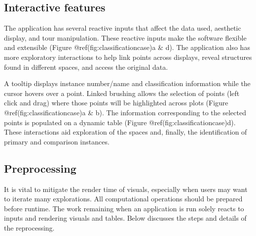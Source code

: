 \documentclass[
]{article}
\begin{document}
\hypertarget{interactive-features}{%
\subsection{Interactive features}\label{interactive-features}}

The application has several reactive inputs that affect the data used,
aesthetic display, and tour manipulation. These reactive inputs make the
software flexible and extensible (Figure @ref(fig:classificationcase)a
\& d). The application also has more exploratory interactions to help
link points across displays, reveal structures found in different
spaces, and access the original data.

A tooltip displays instance number/name and classification information
while the cursor hovers over a point. Linked brushing allows the
selection of points (left click and drag) where those points will be
highlighted across plots (Figure @ref(fig:classificationcase)a \& b).
The information corresponding to the selected points is populated on a
dynamic table (Figure @ref(fig:classificationcase)d). These interactions
aid exploration of the spaces and, finally, the identification of
primary and comparison instances.

\hypertarget{preprocessing}{%
\subsection{Preprocessing}\label{preprocessing}}

It is vital to mitigate the render time of visuals, especially when
users may want to iterate many explorations. All computational
operations should be prepared before runtime. The work remaining when an
application is run solely reacts to inputs and rendering visuals and
tables. Below discusses the steps and details of the reprocessing.
\end{document}
